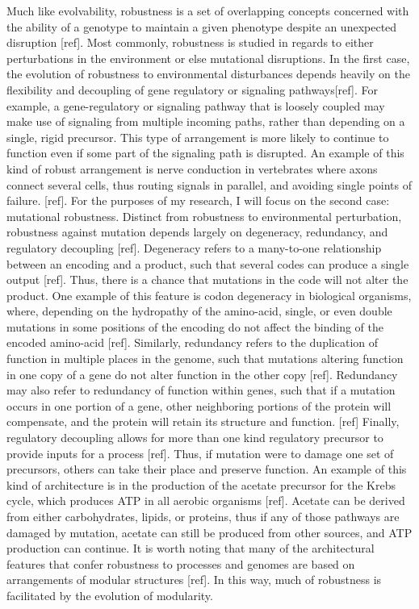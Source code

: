 Much like evolvability, robustness is a set of overlapping concepts concerned with the ability of a genotype to maintain a given phenotype despite an unexpected disruption [ref].  Most commonly, robustness is studied in regards to either perturbations in the environment or else mutational disruptions. In the first case, the evolution of robustness to environmental disturbances depends heavily on the flexibility and decoupling of gene regulatory or signaling pathways[ref]. For example, a gene-regulatory or signaling pathway that is loosely coupled may make use of signaling from multiple incoming paths, rather than depending on a single, rigid precursor. This type of arrangement is more likely to continue to function even if some part of the signaling path is disrupted. An example of this kind of robust arrangement is nerve conduction in vertebrates where axons connect several cells, thus routing signals in parallel, and avoiding single points of failure. [ref].
For the purposes of my research, I will focus on the second case: mutational robustness. Distinct from robustness to environmental perturbation, robustness against mutation depends largely on degeneracy, redundancy, and regulatory decoupling [ref]. Degeneracy refers to a many-to-one relationship between an encoding and a product, such that several codes can produce a single output [ref]. Thus, there is a chance that mutations in the code will not alter the product. One example of this feature is codon degeneracy in biological organisms, where, depending on the hydropathy of the amino-acid, single, or even double mutations in some positions of the encoding do not affect the binding of the encoded amino-acid [ref].
Similarly, redundancy refers to the duplication of function in multiple places in the genome, such that mutations altering function in one copy of a gene do not alter function in the other copy [ref]. Redundancy may also refer to redundancy of function within genes, such that if a mutation occurs in one portion of a gene, other neighboring portions of the protein will compensate, and the protein will retain its structure and function. [ref]
Finally, regulatory decoupling allows for more than one kind regulatory precursor to provide inputs for a process [ref]. Thus, if mutation were to damage one set of precursors, others can take their place and preserve function. An example of this kind of architecture is in the production of the acetate precursor for the Krebs cycle, which produces ATP in all aerobic organisms [ref]. Acetate can be derived from either carbohydrates, lipids, or proteins, thus if any of those pathways are damaged by mutation, acetate can still be produced from other sources, and ATP production can continue.
It is worth noting that many of the architectural features that confer robustness to processes and genomes are based on arrangements of modular structures [ref]. In this way, much of robustness is facilitated by the evolution of modularity.

